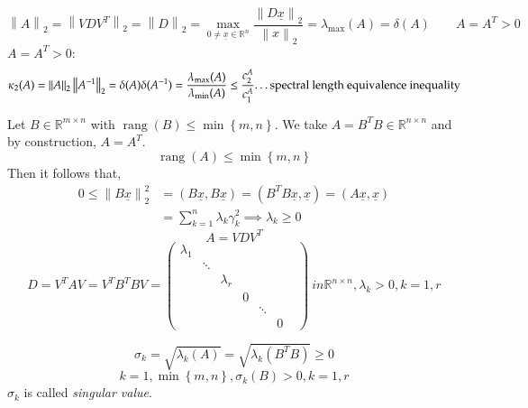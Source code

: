 \documentclass{article}
\newcommand{\set}[1]{\left\{#1\right\}}
\newcommand{\norm}[1]{\left\|#1\right\|}
\begin{document}
\[ \norm{A}_2 = \norm{VDV^T}_2 = \norm{D}_2 = \max_{0 \neq \underline{x} \in \mathbb R^n} \frac{\norm{D \underline{x}}_2}{\norm{x}_2} = \lambda_{\max}(A) = \delta(A) \qquad A = A^T > 0 \]
$A = A^T > 0$:
\[ \kappa_2(A) = \norm{A}_2 \norm{A^{-1}}_2 = \delta(A) \delta(A^{-1}) = \frac{\lambda_{\max}(A)}{\lambda_{\min}(A)} \leq \frac{c_2^A}{c_1^A} \text{\dots spectral length equivalence inequality} \]

Let $B \in \mathbb R^{m\times n}$ with $\operatorname{rang}(B) \leq \min\set{m,n}$.
We take $A = B^T B \in \mathbb R^{n\times n}$ and by construction, $A = A^T$.
\[ \operatorname{rang}(A) \leq \min\set{m,n} \]
Then it follows that,
\begin{align*}
  0 \leq \norm{B\underline{x}}_2^2
    &= (B \underline{x}, B \underline{x}) = (B^T B \underline{x}, \underline{x}) = (A \underline{x}, \underline{x}) \\
    &= \sum_{k=1}^n \lambda_k \gamma_k^2 \implies \lambda_k \geq 0
\end{align*}
\[ A = VDV^T \]
\[ D = V^TAV = V^T B^T B V = \begin{pmatrix} \lambda_1 & & & & & \\ & \ddots & & & & \\ & & \lambda_r & & & \\ & & & 0 & & \\ & & & & \ddots & & \\ & & & & & 0 \end{pmatrix} \ in \mathbb R^{n \times n}, \lambda_k > 0, k = 1, r \]

\[ \sigma_k = \sqrt{\lambda_k(A)} = \sqrt{\lambda_k(B^T B)} \geq 0 \]
\[ k = 1, \min\set{m,n}, \sigma_k(B) > 0, k = 1, r \]
$\sigma_k$ is called \emph{singular value}.
\end{document}

